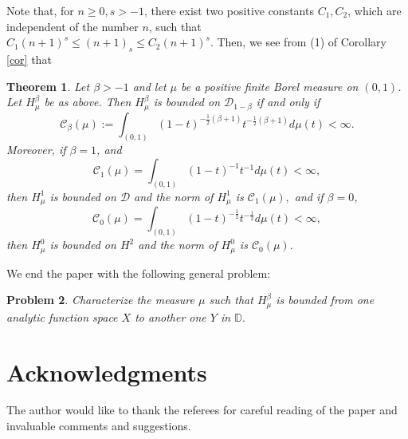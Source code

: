 \documentclass[10pt]{amsart}
\newtheorem{theorem}{Theorem}[section]
\newtheorem{problem}[theorem]{Problem}
\theoremstyle{definition}
\theoremstyle{question}
\numberwithin{equation}{section}
\begin{document}
Note that, for $n\geq 0, s>-1$, there exist two positive constants $C_1, C_2$, which are independent of the number $n$, such that $C_1 (n+1)^s \leq (n+1)_{s}\leq C_2 (n+1)^s$. Then, we see from (1) of Corollary \ref{cor} that
 \begin{theorem}

Let $\beta>-1$ and let $\mu$ be a positive finite Borel measure on $(0,1)$. Let $H_{\mu}^{\beta}$ be as above. Then $H_{\mu}^{\beta}$ is bounded on $\mathcal{D}_{1-\beta}$ if and only if 
$$\mathcal{C}_{\beta}(\mu):=\int_{(0,1)} (1-t)^{-\frac{1}{2}(\beta+1)} t^{-\frac{1}{2}(\beta+1)}d\mu(t)<\infty.$$
Moreover, if $\beta=1$, and 
$$\mathcal{C}_1(\mu)=\int_{(0,1)} (1-t)^{-1} t^{-1}d\mu(t)<\infty,$$ 
then $H_{\mu}^{1}$ is bounded on $\mathcal{D}$ and the norm of $H_{\mu}^{1}$ is $\mathcal{C}_1(\mu),$ and if $\beta=0$,
$$\mathcal{C}_0(\mu)=\int_{(0,1)} (1-t)^{-\frac{1}{2}} t^{-\frac{1}{2}}d\mu(t)<\infty,$$ 
then $H_{\mu}^{0}$ is bounded on $H^2$ and the norm of $H_{\mu}^{0}$ is $\mathcal{C}_0(\mu).$ 
\end{theorem}
We end the paper with the following general problem:
\begin{problem}
Characterize the measure $\mu$ such that $H_{\mu}^{\beta}$ is bounded from one analytic function space $X$ to another one $Y$ in $\mathbb{D}.$
\end{problem}

\section{\bf {Acknowledgments}}
The author would like to thank the referees for careful reading of the paper and invaluable comments and suggestions.
\end{document}
